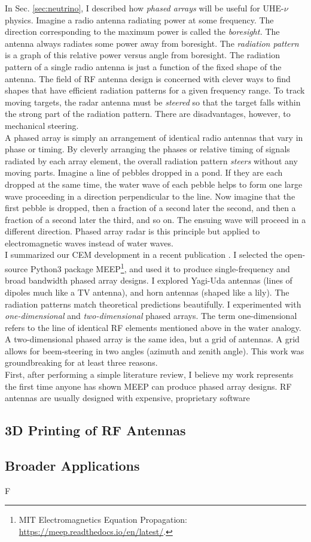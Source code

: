 \documentclass[../../../main.tex]{subfiles}
\begin{document}
In Sec. \ref{sec:neutrino}, I described how \textit{phased arrays} will be useful for UHE-$\nu$ physics.  Imagine a radio antenna radiating power at some frequency.  The direction corresponding to the maximum power is called the \textit{boresight.}  The antenna always radiates some power away from boresight.  The \textit{radiation pattern} is a graph of this relative power versus angle from boresight.  The radiation pattern of a single radio antenna is just a function of the fixed shape of the antenna.  The field of RF antenna design is concerned with clever ways to find shapes that have efficient radiation patterns for a given frequency range.  To track moving targets, the radar antenna must be \textit{steered} so that the target falls within the strong part of the radiation pattern.  There are disadvantages, however, to mechanical steering.
\\
\vspace{0.25cm}
A phased array is simply an arrangement of identical radio antennas that vary in phase or timing.  By cleverly arranging the phases or relative timing of signals radiated by each array element, the overall radiation pattern \textit{steers} without any moving parts.  Imagine a line of pebbles dropped in a pond.  If they are each dropped at the same time, the water wave of each pebble helps to form one large wave proceeding in a direction perpendicular to the line.  Now imagine that the first pebble is dropped, then a fraction of a second later the second, and then a fraction of a second later the third, and so on.  The ensuing wave will proceed in a different direction.  Phased array radar is this principle but applied to electromagnetic waves instead of water waves.
\\
\vspace{0.25cm}
I summarized our CEM development in a recent publication \cite{electronics10040415}.  I selected the open-source Python3 package MEEP\footnote{MIT Electromagnetics Equation Propagation: \url{https://meep.readthedocs.io/en/latest/}.}, and used it to produce single-frequency and broad bandwidth phased array designs.  I explored Yagi-Uda antennas (lines of dipoles much like a TV antenna), and horn antennas (shaped like a lily).  The radiation patterns match theoretical predictions beautifully.  I experimented with \textit{one-dimensional} and \textit{two-dimensional} phased arrays.  The term one-dimensional refers to the line of identical RF elements mentioned above in the water analogy.  A two-dimensional phased array is the same idea, but a grid of antennas.  A grid allows for beem-steering in two angles (azimuth and zenith angle).  This work was groundbreaking for at least three reasons.
\\
\vspace{0.25cm}
First, after performing a simple literature review, I believe my work represents the first time anyone has shown MEEP can produce phased array designs.  RF antennas are usually designed with expensive, proprietary software

\subsection{3D Printing of RF Antennas}
\label{sec:3d_printer}

\subsection{Broader Applications}
F
\end{document}
